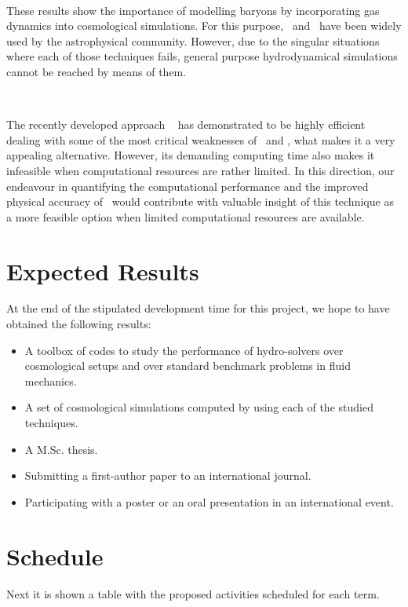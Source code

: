 \documentclass[a4,useAMS,usenatbib,usegraphicx,12pt]{article}
\begin{document}
\

These results show the importance of modelling baryons by incorporating gas 
dynamics into cosmological simulations. For this purpose, \AMR\ and \SPH\ have
been widely used by the astrophysical community. However, due to the singular 
situations where each of those techniques fails, general purpose hydrodynamical
simulations cannot be reached by means of them.

\

The recently developed approach \AREPO\ \citet{Springel10} has demonstrated to 
be highly efficient dealing with some of the most critical weaknesses of \AMR\ 
and \SPH, what makes it a very appealing alternative. However, its demanding 
computing time also makes it infeasible when computational resources are rather 
limited. In this direction, our endeavour in quantifying the computational 
performance and the improved physical accuracy of \VPH\ would contribute with 
valuable insight of this technique as a more feasible option when limited 
computational resources are available.


\section{Expected Results}
At the end of the stipulated development time for this project, we hope to have
obtained the following results:
\begin{itemize}
\item A toolbox of codes to study the performance of hydro-solvers over 
cosmological setups and over standard benchmark problems in fluid mechanics.
\item A set of cosmological simulations computed by using each of the studied
techniques.
\item A M.Sc. thesis.
\item Submitting a first-author paper to an international journal.
\item Participating with a poster or an oral presentation in an international
event.
\end{itemize}


\section{Schedule}
Next it is shown a table with the proposed activities scheduled for each term.
\end{document}
